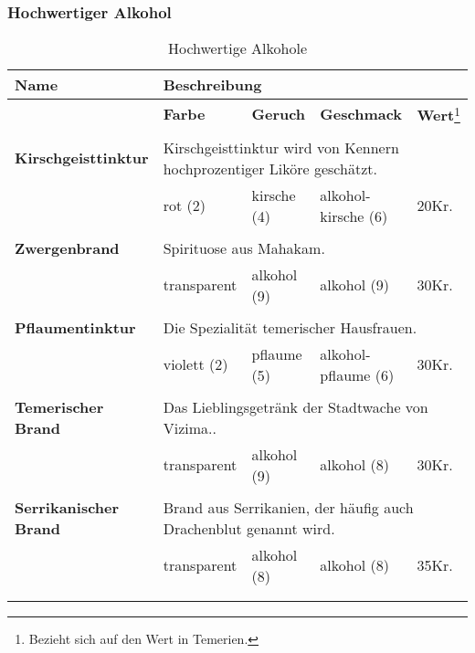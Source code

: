 \subsubsection{Hochwertiger Alkohol}

\begin{longtable}{|p{6cm}|p{}|p{}|p{}|p{1cm}|}
\hline
\textbf{Name} & \multicolumn{4}{p{10cm}|}{\textbf{Beschreibung}} \\ \hline
\multicolumn{1}{r|}{} & \textbf{Farbe} & \textbf{Geruch} & \textbf{Geschmack} & \textbf{Wert}\footnote{Bezieht sich auf den Wert in Temerien.} \\ \cline{2-5}
\multicolumn{5}{c}{} \\ \hline

\textbf{Kirschgeisttinktur} & \multicolumn{4}{p{10cm}|}{Kirschgeisttinktur wird von Kennern hochprozentiger Liköre geschätzt.} \\ \hline
\multicolumn{1}{r|}{} & rot (2) & kirsche (4) & alkohol-kirsche (6) & 20Kr. \\ \cline{2-5}

\multicolumn{5}{c}{} \\ \hline

\textbf{Zwergenbrand} & \multicolumn{4}{p{10cm}|}{Spirituose aus Mahakam.} \\ \hline
\multicolumn{1}{r|}{} & transparent & alkohol (9) & alkohol (9) & 30Kr. \\ \cline{2-5}

\multicolumn{5}{c}{} \\ \hline

\textbf{Pflaumentinktur} & \multicolumn{4}{p{10cm}|}{Die Spezialität temerischer Hausfrauen.} \\ \hline
\multicolumn{1}{r|}{} & violett (2) & pflaume (5) & alkohol-pflaume (6) & 30Kr. \\ \cline{2-5}

\multicolumn{5}{c}{} \\ \hline

\textbf{Temerischer Brand} & \multicolumn{4}{p{10cm}|}{Das Lieblingsgetränk der Stadtwache von Vizima..} \\ \hline
\multicolumn{1}{r|}{} & transparent & alkohol (9) & alkohol (8) & 30Kr. \\ \cline{2-5}

\multicolumn{5}{c}{} \\ \hline

\textbf{Serrikanischer Brand} & \multicolumn{4}{p{10cm}|}{Brand aus Serrikanien, der häufig auch Drachenblut genannt wird.} \\ \hline
\multicolumn{1}{r|}{} & transparent & alkohol (8) & alkohol (8) & 35Kr. \\ \cline{2-5}

\multicolumn{5}{c}{} \\ 

\caption{Hochwertige Alkohole}
\label{tab:hochwertige_alkohole}
\end{longtable}


